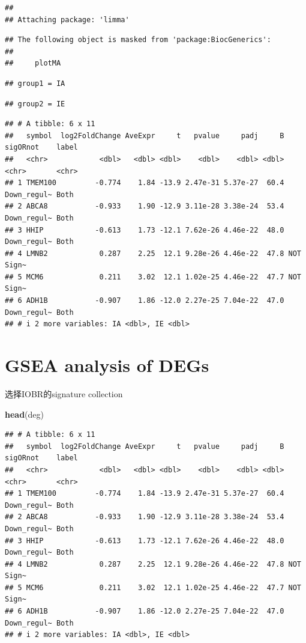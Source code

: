 \documentclass[
  12pt,
]{book}
\newenvironment{Shaded}{\begin{snugshade}}{\end{snugshade}}
\newcommand{\FunctionTok}[1]{\textcolor[rgb]{0.13,0.29,0.53}{\textbf{#1}}}
\newcommand{\NormalTok}[1]{#1}
\begin{document}
\begin{verbatim}
## 
## Attaching package: 'limma'
\end{verbatim}

\begin{verbatim}
## The following object is masked from 'package:BiocGenerics':
## 
##     plotMA
\end{verbatim}

\begin{verbatim}
## group1 = IA
\end{verbatim}

\begin{verbatim}
## group2 = IE
\end{verbatim}

\begin{verbatim}
## # A tibble: 6 x 11
##   symbol  log2FoldChange AveExpr     t   pvalue     padj     B sigORnot    label
##   <chr>            <dbl>   <dbl> <dbl>    <dbl>    <dbl> <dbl> <chr>       <chr>
## 1 TMEM100         -0.774    1.84 -13.9 2.47e-31 5.37e-27  60.4 Down_regul~ Both 
## 2 ABCA8           -0.933    1.90 -12.9 3.11e-28 3.38e-24  53.4 Down_regul~ Both 
## 3 HHIP            -0.613    1.73 -12.1 7.62e-26 4.46e-22  48.0 Down_regul~ Both 
## 4 LMNB2            0.287    2.25  12.1 9.28e-26 4.46e-22  47.8 NOT         Sign~
## 5 MCM6             0.211    3.02  12.1 1.02e-25 4.46e-22  47.7 NOT         Sign~
## 6 ADH1B           -0.907    1.86 -12.0 2.27e-25 7.04e-22  47.0 Down_regul~ Both 
## # i 2 more variables: IA <dbl>, IE <dbl>
\end{verbatim}

\hypertarget{gsea-analysis-of-degs}{%
\section{GSEA analysis of DEGs}\label{gsea-analysis-of-degs}}

选择IOBR的signature collection

\begin{Shaded}
\begin{Highlighting}[]
\FunctionTok{head}\NormalTok{(deg)}
\end{Highlighting}
\end{Shaded}

\begin{verbatim}
## # A tibble: 6 x 11
##   symbol  log2FoldChange AveExpr     t   pvalue     padj     B sigORnot    label
##   <chr>            <dbl>   <dbl> <dbl>    <dbl>    <dbl> <dbl> <chr>       <chr>
## 1 TMEM100         -0.774    1.84 -13.9 2.47e-31 5.37e-27  60.4 Down_regul~ Both 
## 2 ABCA8           -0.933    1.90 -12.9 3.11e-28 3.38e-24  53.4 Down_regul~ Both 
## 3 HHIP            -0.613    1.73 -12.1 7.62e-26 4.46e-22  48.0 Down_regul~ Both 
## 4 LMNB2            0.287    2.25  12.1 9.28e-26 4.46e-22  47.8 NOT         Sign~
## 5 MCM6             0.211    3.02  12.1 1.02e-25 4.46e-22  47.7 NOT         Sign~
## 6 ADH1B           -0.907    1.86 -12.0 2.27e-25 7.04e-22  47.0 Down_regul~ Both 
## # i 2 more variables: IA <dbl>, IE <dbl>
\end{verbatim}
\end{document}
